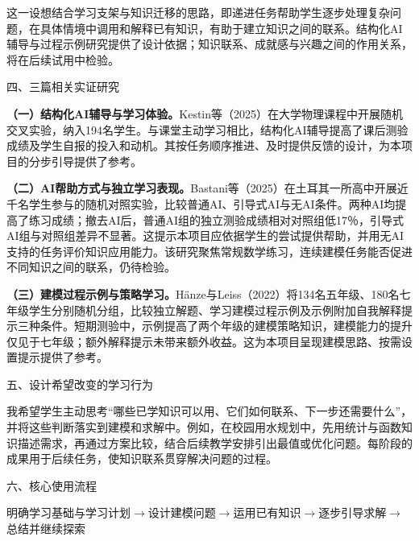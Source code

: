 \documentclass[UTF8,a4paper,11pt,fontset=windows]{ctexart}
\newcommand{\lead}[1]{\par\addvspace{7pt}\noindent
  {\sffamily\fontsize{11.5pt}{16pt}\selectfont #1}\par\nobreak\vspace{1pt}}
\begin{document}
这一设想结合学习支架与知识迁移的思路，即递进任务帮助学生逐步处理复杂问题，在具体情境中调用和解释已有知识，有助于建立知识之间的联系。结构化AI辅导与过程示例研究提供了设计依据\cite{kestin2025,hanze2022}；知识联系、成就感与兴趣之间的作用关系，将在后续试用中检验。

\lead{四、三篇相关实证研究}

\noindent\textbf{（一）结构化AI辅导与学习体验。}Kestin等（2025）\cite{kestin2025}在大学物理课程中开展随机交叉实验，纳入194名学生。与课堂主动学习相比，结构化AI辅导提高了课后测验成绩及学生自报的投入和动机。其按任务顺序推进、及时提供反馈的设计，为本项目的分步引导提供了参考。

\noindent\textbf{（二）AI帮助方式与独立学习表现。}Bastani等（2025）\cite{bastani2025}在土耳其一所高中开展近千名学生参与的随机对照实验，比较普通AI、引导式AI与无AI条件。两种AI均提高了练习成绩；撤去AI后，普通AI组的独立测验成绩相对对照组低17％，引导式AI组与对照组差异不显著。这提示本项目应依据学生的尝试提供帮助，并用无AI支持的任务评价知识应用能力。该研究聚焦常规数学练习，连续建模任务能否促进不同知识之间的联系，仍待检验。

\noindent\textbf{（三）建模过程示例与策略学习。}Hänze与Leiss（2022）\cite{hanze2022}将134名五年级、180名七年级学生分别随机分组，比较独立解题、学习建模过程示例及示例附加自我解释提示三种条件。短期测验中，示例提高了两个年级的建模策略知识，建模能力的提升仅见于七年级；额外解释提示未带来额外收益。这为本项目呈现建模思路、按需设置提示提供了参考。


\newpage

\lead{五、设计希望改变的学习行为}

我希望学生主动思考“哪些已学知识可以用、它们如何联系、下一步还需要什么”，并将这些判断落实到建模和求解中。例如，在校园用水规划中，先用统计与函数知识描述需求，再通过方案比较，结合后续教学安排引出最值或优化问题。每阶段的成果用于后续任务，使知识联系贯穿解决问题的过程。

\lead{六、核心使用流程}

\begin{center}
\vspace{-3pt}
{\fontsize{9.5pt}{13pt}\selectfont
明确学习基础与学习计划\(\longrightarrow\)设计建模问题\(\longrightarrow\)运用已有知识\(\longrightarrow\)逐步引导求解\(\longrightarrow\)总结并继续探索}\par
{}
\vspace{-3pt}
\end{center}
\end{document}
